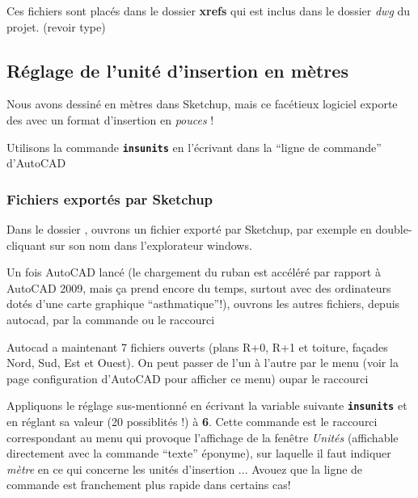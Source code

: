 \documentclass[a4paper,12pt,french]{sphinxmanual}
\begin{document}
Ces fichiers sont placés dans le dossier \textbf{xrefs} qui est inclus dans le dossier \emph{dwg} du projet. (revoir {\hyperref[init_su+acad/demarrage:arborescence\string-projet]{}}  type)


\subsection{Réglage de l'unité d'insertion en mètres}
\label{init_su+acad/acad1:reglage-de-l-unite-d-insertion-en-metres}
Nous avons dessiné en mètres dans Sketchup, mais ce facétieux logiciel exporte des  avec un format d'insertion en \emph{pouces} !

Utilisons la commande \textbf{\texttt{insunits}} en l'écrivant dans la ``ligne de commande'' d'AutoCAD


\subsubsection{Fichiers exportés par Sketchup}
\label{init_su+acad/acad1:fichiers-exportes-par-su}
Dans le dossier , ouvrons un fichier exporté par Sketchup, par exemple  en double-cliquant sur son nom dans l'explorateur windows.

Un fois AutoCAD lancé (le chargement du ruban est accéléré par rapport à AutoCAD 2009, mais ça prend encore du temps, surtout avec des ordinateurs dotés d'une carte graphique ``asthmatique''!), ouvrons les autres fichiers, depuis autocad, par la commande  ou le raccourci 

Autocad a maintenant 7 fichiers ouverts (plans R+0, R+1 et toiture, façades Nord, Sud, Est et Ouest). On peut passer de l'un à l'autre par le menu  (voir la page configuration d'AutoCAD pour afficher ce menu) oupar le raccourci 

Appliquons le réglage sus-mentionné en écrivant la variable suivante \textbf{\texttt{insunits}} et en réglant sa valeur (20 possiblités !) à \textbf{6}. Cette commande est le raccourci correspondant au menu  qui provoque l'affichage de la fenêtre \emph{Unités} (affichable directement avec la commande ``texte'' éponyme), sur laquelle il faut indiquer \emph{mètre} en ce qui concerne les unités d'insertion ... Avouez que la ligne de commande est franchement plus rapide dans certains cas!
\end{document}
